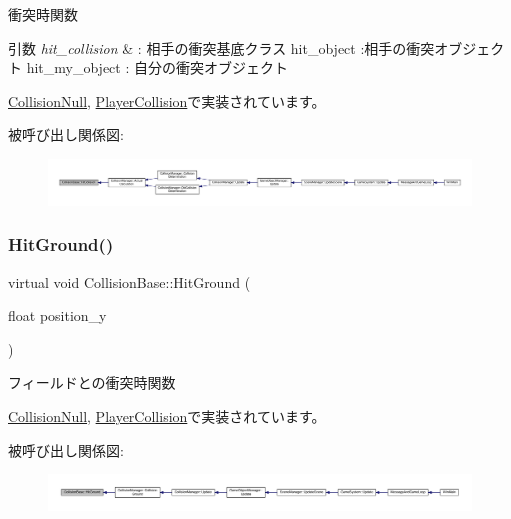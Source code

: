 衝突時関数 


\begin{DoxyParams}{引数}
{\em hit\+\_\+collision} & \+: 相手の衝突基底クラス hit\+\_\+object \+:相手の衝突オブジェクト hit\+\_\+my\+\_\+object \+: 自分の衝突オブジェクト \\
\hline
\end{DoxyParams}


\mbox{\hyperlink{class_collision_null_a580f507d8918865679feec3cc7b613d1}{Collision\+Null}}, \mbox{\hyperlink{class_player_collision_ad937a5fd226e742270202bf4eff53767}{Player\+Collision}}で実装されています。

被呼び出し関係図\+:
\nopagebreak
\begin{figure}[H]
\begin{center}
\leavevmode
\includegraphics[width=350pt]{class_collision_base_a5c94fe03f875595758e83eb2a176e45d_icgraph}
\end{center}
\end{figure}
\mbox{\label{class_collision_base_a48c9d1d9e4286cde5054d4d2aa70bdd8}} 
\subsubsection{\texorpdfstring{Hit\+Ground()}{HitGround()}}
{\footnotesize\ttfamily virtual void Collision\+Base\+::\+Hit\+Ground (\begin{DoxyParamCaption}\item[{float}]{position\+\_\+y }\end{DoxyParamCaption})\hspace{0.3cm}{\ttfamily [pure virtual]}}



フィールドとの衝突時関数 



\mbox{\hyperlink{class_collision_null_a75900c2cec4e49336701e2e3c64e5bfe}{Collision\+Null}}, \mbox{\hyperlink{class_player_collision_a3522ce17b1e1752f2737c2243582ecb0}{Player\+Collision}}で実装されています。

被呼び出し関係図\+:
\nopagebreak
\begin{figure}[H]
\begin{center}
\leavevmode
\includegraphics[width=350pt]{class_collision_base_a48c9d1d9e4286cde5054d4d2aa70bdd8_icgraph}
\end{center}
\end{figure}
\mbox{\label{class_collision_base_a9b64fc5c3f2aac2a05296985ef799fb1}} 
